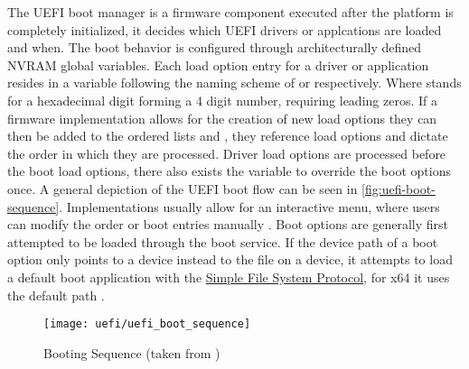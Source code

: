 The \ac{UEFI} boot manager is a firmware component executed after the platform is completely initialized, it decides which \ac{UEFI} drivers or applcations are loaded and when.
The boot behavior is configured through architecturally defined \ac{NVRAM} global variables\cite[Section 3.1]{uefi-spec}.
Each load option entry for a driver or application resides in a variable following the naming scheme of  or  respectively. Where \code{\#} stands for a hexadecimal digit forming a 4 digit number, requiring leading zeros.
If a firmware implementation allows for the creation of new load options they can then be added to the ordered lists  and , they reference load options and dictate the order in which they are processed.
Driver load options are processed before the boot load options, there also exists the  variable to override the boot options once.
A general depiction of the \ac{UEFI} boot flow can be seen in \autoref{fig:uefi-boot-sequence}.
Implementations usually allow for an interactive menu, where users can modify the order or boot entries manually \cite[Section 3.1.1]{uefi-spec}.
Boot options are generally first attempted to be loaded through the  boot service.
If the device path of a boot option only points to a device instead to the file on a device, it attempts to load a default boot application with the \hyperref[lst:simple-file-system-protocol]{Simple File System Protocol}\cite[Section 3.1.2]{uefi-spec}, for x64 it uses the default path  \cite[Section 3.5]{uefi-spec}.




\begin{figure}[htb]%
    \centering%
    \texttt{[image: uefi/uefi\_boot\_sequence]}%
    \caption{Booting Sequence (taken from \cite[Figure 2-1]{uefi-spec})}%
    \label{fig:uefi-boot-sequence}%
\end{figure}


